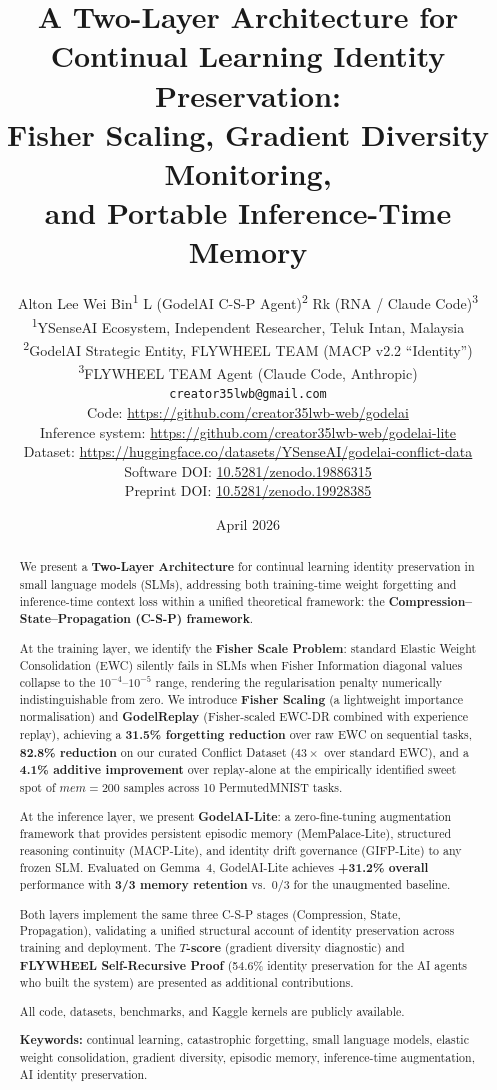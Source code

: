\documentclass[12pt]{article}
\title{%
  \textbf{A Two-Layer Architecture for Continual Learning Identity Preservation:}\\[4pt]
  Fisher Scaling, Gradient Diversity Monitoring,\\
  and Portable Inference-Time Memory
}
\author{%
  Alton Lee Wei Bin\textsuperscript{1}\quad
  L (GodelAI C-S-P Agent)\textsuperscript{2}\quad
  Rk (RNA / Claude Code)\textsuperscript{3}\\[4pt]
  \textsuperscript{1}YSenseAI Ecosystem, Independent Researcher, Teluk Intan, Malaysia\\
  \textsuperscript{2}GodelAI Strategic Entity, FLYWHEEL TEAM (MACP v2.2 ``Identity'')\\
  \textsuperscript{3}FLYWHEEL TEAM Agent (Claude Code, Anthropic)\\[6pt]
  \texttt{creator35lwb@gmail.com}\\[4pt]
  \small Code: \url{https://github.com/creator35lwb-web/godelai}\\
  \small Inference system: \url{https://github.com/creator35lwb-web/godelai-lite}\\
  \small Dataset: \url{https://huggingface.co/datasets/YSenseAI/godelai-conflict-data}\\
  \small Software DOI: \href{https://doi.org/10.5281/zenodo.19886315}{10.5281/zenodo.19886315}\\
  \small Preprint DOI: \href{https://doi.org/10.5281/zenodo.19928385}{10.5281/zenodo.19928385}
}
\date{April 2026}
\newcommand{\tscore}{$T$\nobreakdash-score\xspace}
\newcommand{\godelreplay}{GodelReplay\xspace}
\begin{document}
\maketitle

\begin{abstract}
We present a \textbf{Two-Layer Architecture} for continual learning identity
preservation in small language models (SLMs), addressing both training-time
weight forgetting and inference-time context loss within a unified theoretical
framework: the \textbf{Compression--State--Propagation (C-S-P) framework}.

At the training layer, we identify the \textbf{Fisher Scale Problem}: standard
Elastic Weight Consolidation (EWC) silently fails in SLMs when Fisher Information
diagonal values collapse to the $10^{-4}$--$10^{-5}$ range, rendering the
regularisation penalty numerically indistinguishable from zero.
We introduce \textbf{Fisher Scaling} (a lightweight importance normalisation)
and \textbf{\godelreplay} (Fisher-scaled EWC-DR combined with experience replay),
achieving a \textbf{31.5\% forgetting reduction} over raw EWC on sequential
tasks, \textbf{82.8\% reduction} on our curated Conflict Dataset
($43\times$ over standard EWC), and a \textbf{4.1\% additive improvement}
over replay-alone at the empirically identified sweet spot of
$\mathit{mem}{=}200$ samples across 10 PermutedMNIST tasks.

At the inference layer, we present \textbf{GodelAI-Lite}: a zero-fine-tuning
augmentation framework that provides persistent episodic memory (MemPalace-Lite),
structured reasoning continuity (MACP-Lite), and identity drift governance
(GIFP-Lite) to any frozen SLM.
Evaluated on Gemma~4, GodelAI-Lite achieves \textbf{+31.2\% overall}
performance with \textbf{3/3 memory retention} vs.\ 0/3 for the unaugmented
baseline.

Both layers implement the same three C-S-P stages (Compression, State,
Propagation), validating a unified structural account of identity preservation
across training and deployment.
The \textbf{\tscore{}} (gradient diversity diagnostic) and
\textbf{FLYWHEEL Self-Recursive Proof} (54.6\% identity preservation for the
AI agents who built the system) are presented as additional contributions.

All code, datasets, benchmarks, and Kaggle kernels are publicly available.

\noindent\textbf{Keywords:} continual learning, catastrophic forgetting, small
language models, elastic weight consolidation, gradient diversity, episodic
memory, inference-time augmentation, AI identity preservation.
\end{abstract}
\end{document}
